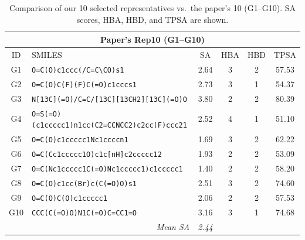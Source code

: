 \documentclass[11pt,a4paper]{article}
\begin{document}
\begin{table}[H]
\centering
\caption{Comparison of our 10 selected representatives vs.\ the paper's 10 (G1--G10). SA scores, HBA, HBD, and TPSA are shown.}
\label{tab:rep10_comparison}
\small
\begin{tabular}{clcccc}
\toprule
\multicolumn{6}{c}{\textbf{Paper's Rep10 (G1--G10)}} \\
\midrule
ID & SMILES & SA & HBA & HBD & TPSA \\
\midrule
G1 & \texttt{O=C(O)c1ccc(/C=C\textbackslash CO)s1} & 2.64 & 3 & 2 & 57.53 \\
G2 & \texttt{O=C(O)C(F)(F)C(=O)c1cccs1} & 2.73 & 3 & 1 & 54.37 \\
G3 & \texttt{N[13C](=O)/C=C/[13C][13CH2][13C](=O)O} & 3.80 & 2 & 2 & 80.39 \\
G4 & \texttt{O=S(=O)(c1ccccc1)n1cc(C2=CCNCC2)c2cc(F)ccc21} & 2.52 & 4 & 1 & 51.10 \\
G5 & \texttt{O=C(O)c1ccccc1Nc1ccccn1} & 1.69 & 3 & 2 & 62.22 \\
G6 & \texttt{O=C(Cc1ccccc1O)c1c[nH]c2ccccc12} & 1.93 & 2 & 2 & 53.09 \\
G7 & \texttt{O=C(Nc1ccccc1C(=O)Nc1ccccc1)c1ccccc1} & 1.40 & 2 & 2 & 58.20 \\
G8 & \texttt{O=C(O)c1cc(Br)c(C(=O)O)s1} & 2.51 & 3 & 2 & 74.60 \\
G9 & \texttt{O=C(O)C(O)c1ccccc1} & 2.06 & 2 & 2 & 57.53 \\
G10 & \texttt{CCC(C(=O)O)N1C(=O)C=CC1=O} & 3.16 & 3 & 1 & 74.68 \\
\midrule
\multicolumn{2}{r}{\textit{Mean SA}} & \textit{2.44} & & & \\
\bottomrule
\end{tabular}

\vspace{8pt}


\end{table}
\end{document}
